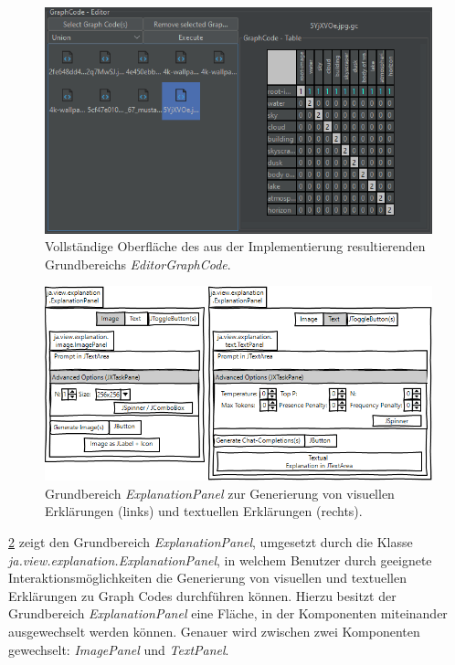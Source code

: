 \begin{figure}[!ht]
  \includegraphics[width=\textwidth]{chapter/chapter_4/wireframe-impl-ui-left-complete}
  \caption{Vollständige Oberfläche des aus der Implementierung resultierenden Grundbereichs \textit{EditorGraphCode}.}
  \label{sec4:impl:par:ui-elements:fig:wireframe-ui-left-complete}
\end{figure}


\clearpage

\begin{figure}[!ht]
  \includegraphics[width=\textwidth]{chapter/chapter_4/wireframe-impl-right}
  \caption{Grundbereich \textit{ExplanationPanel} zur Generierung von visuellen Erklärungen (links) und textuellen Erklärungen (rechts).}
  \label{sec4:impl:subsubsec:ui:fig:wireframe-explanation-panel}
\end{figure}

\cref{sec4:impl:subsubsec:ui:fig:wireframe-explanation-panel} zeigt den Grundbereich \textit{ExplanationPanel}, umgesetzt durch die Klasse \textit{ja.view.explanation.ExplanationPanel}, in welchem Benutzer durch geeignete Interaktionsmöglichkeiten die Generierung von visuellen und textuellen Erklärungen zu Graph Codes durchführen können.
Hierzu besitzt der Grundbereich \textit{ExplanationPanel} eine Fläche, in der Komponenten miteinander ausgewechselt werden können.
Genauer wird zwischen zwei Komponenten gewechselt: \textit{ImagePanel} und \textit{TextPanel}.

